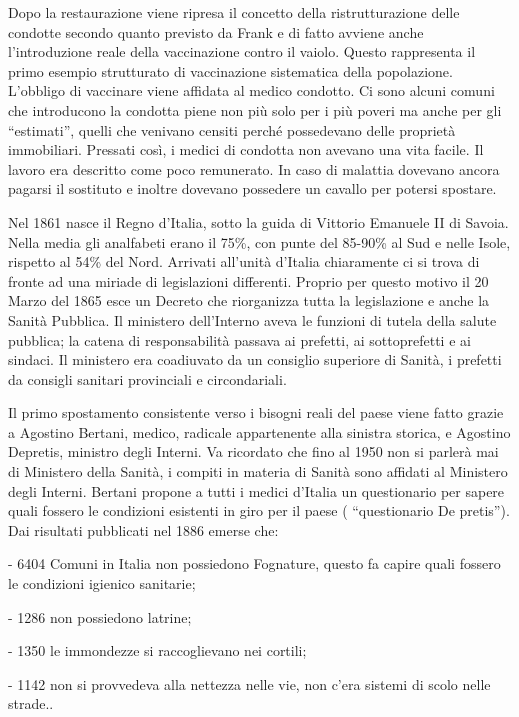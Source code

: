 \documentclass[]{article}
\begin{document}
Dopo la restaurazione viene ripresa il concetto della ristrutturazione
delle condotte secondo quanto previsto da Frank e di fatto avviene anche
l'introduzione reale della vaccinazione contro il vaiolo. Questo
rappresenta il primo esempio strutturato di vaccinazione sistematica
della popolazione. L'obbligo di vaccinare viene affidata al medico
condotto. Ci sono alcuni comuni che introducono la condotta piene non
più solo per i più poveri ma anche per gli ``estimati'', quelli che
venivano censiti perché possedevano delle proprietà immobiliari.
Pressati così, i medici di condotta non avevano una vita facile. Il
lavoro era descritto come poco remunerato. In caso di malattia dovevano
ancora pagarsi il sostituto e inoltre dovevano possedere un cavallo per
potersi spostare.

Nel 1861 nasce il Regno d'Italia, sotto la guida di Vittorio Emanuele II
di Savoia. Nella media gli analfabeti erano il 75\%, con punte del
85-90\% al Sud e nelle Isole, rispetto al 54\% del Nord. Arrivati
all'unità d'Italia chiaramente ci si trova di fronte ad una miriade di
legislazioni differenti. Proprio per questo motivo il 20 Marzo del 1865
esce un Decreto che riorganizza tutta la legislazione e anche la Sanità
Pubblica. Il ministero dell'Interno aveva le funzioni di tutela della
salute pubblica; la catena di responsabilità passava ai prefetti, ai
sottoprefetti e ai sindaci. Il ministero era coadiuvato da un consiglio
superiore di Sanità, i prefetti da consigli sanitari provinciali e
circondariali.

Il primo spostamento consistente verso i bisogni reali del paese viene
fatto grazie a Agostino Bertani, medico, radicale appartenente alla
sinistra storica, e Agostino Depretis, ministro degli Interni. Va
ricordato che fino al 1950 non si parlerà mai di Ministero della Sanità,
i compiti in materia di Sanità sono affidati al Ministero degli Interni.
Bertani propone a tutti i medici d'Italia un questionario per sapere
quali fossero le condizioni esistenti in giro per il paese (
``questionario De pretis''). Dai risultati pubblicati nel 1886 emerse
che:

- 6404 Comuni in Italia non possiedono Fognature, questo fa capire quali
fossero le condizioni igienico sanitarie;

- 1286 non possiedono latrine;

- 1350 le immondezze si raccoglievano nei cortili;

- 1142 non si provvedeva alla nettezza nelle vie, non c'era sistemi di
scolo nelle strade..
\end{document}
